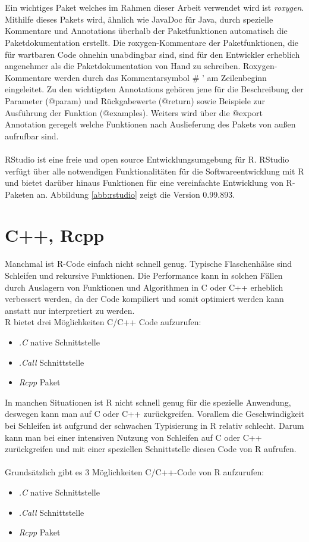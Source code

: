 \\
\\
Ein wichtiges Paket welches im Rahmen dieser Arbeit verwendet wird ist \emph{roxygen}. Mithilfe dieses Pakets wird, ähnlich wie JavaDoc für Java, durch spezielle Kommentare und Annotations überhalb der Paketfunktionen automatisch die Paketdokumentation erstellt. Die roxygen-Kommentare der Paketfunktionen, die für wartbaren Code ohnehin unabdingbar sind, sind für den Entwickler erheblich angenehmer als die Paketdokumentation von Hand zu schreiben. Roxygen-Kommentare werden durch das Kommentarsymbol \# ' am Zeilenbeginn eingeleitet. Zu den wichtigsten Annotations gehören jene für die Beschreibung der Parameter (@param) und Rückgabewerte (@return) sowie Beispiele zur Ausführung der Funktion (@examples). Weiters wird über die @export Annotation geregelt welche Funktionen nach Auslieferung des Pakets von außen aufrufbar sind.
\\
\\
RStudio ist eine freie und open source Entwicklungsumgebung für R. RStudio verfügt über alle notwendigen Funktionalitäten für die Softwareentwicklung mit R und bietet darüber hinaus Funktionen für eine vereinfachte Entwicklung von R-Paketen an. Abbildung \ref{abb:rstudio} zeigt die Version 0.99.893. 
\section{C++, Rcpp}
\label{kapitel:rcpp}
Manchmal ist R-Code einfach nicht schnell genug. Typische Flaschenhälse sind Schleifen und rekursive Funktionen. Die Performance kann in solchen Fällen durch Auslagern von Funktionen und Algorithmen in C oder C++ erheblich verbessert werden, da der Code kompiliert und somit optimiert werden kann anstatt nur interpretiert zu werden.\\
R bietet drei Möglichkeiten C/C++ Code aufzurufen:
\begin{itemize}
	\item \emph{.C} native Schnittstelle
	\item \emph{.Call} Schnittstelle
	\item \emph{Rcpp} Paket
\end{itemize}
In manchen Situationen ist R nicht schnell genug für die spezielle Anwendung, deswegen kann man auf C oder C++ zurückgreifen. Vorallem die Geschwindigkeit bei Schleifen ist aufgrund der schwachen Typisierung in R relativ schlecht. Darum kann man bei einer intensiven Nutzung von Schleifen auf C oder C++ zurückgreifen und mit einer speziellen Schnittstelle diesen Code von R aufrufen.
\\
\\
Grundsätzlich gibt es 3 Möglichkeiten C/C++-Code von R aufzurufen:
\begin{itemize}
	\item \emph{.C} native Schnittstelle
	\item \emph{.Call} Schnittstelle
	\item \emph{Rcpp} Paket
\end{itemize}

